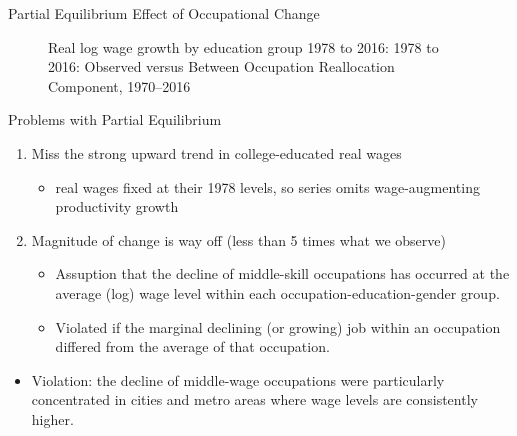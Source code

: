 \documentclass{beamer}
\begin{document}
\begin{frame}{Partial Equilibrium Effect of Occupational Change}
\begin{figure}
\begin{center}
		\caption{Real log wage growth by education group 1978 to 2016: 1978 to 2016: Observed versus Between Occupation Reallocation Component, 1970–2016}
	\end{center}
	
\end{figure}

\end{frame}


\begin{frame}{Problems with Partial Equilibrium}

	\begin{enumerate}
		
		\item Miss the strong upward trend in college-educated real wages
		
		\begin{itemize}
			
			\item real wages fixed at their 1978 levels, so series omits wage-augmenting productivity growth
			
		\end{itemize}
	
			\item Magnitude of change is way off (less than 5 times what we observe)
	
	\begin{itemize}
		
		\item Assuption that the decline of middle-skill occupations has occurred at the average (log) wage level within each occupation-education-gender group.
		
		\item Violated if the marginal declining (or growing) job within an occupation differed from the average of that occupation.
		
	\end{itemize}

		
	\end{enumerate}

	\begin{itemize}
		
		\item Violation: the decline of middle-wage occupations were particularly concentrated in cities and metro areas where wage levels are consistently higher.
		
	\end{itemize}

\end{frame}
\end{document}
